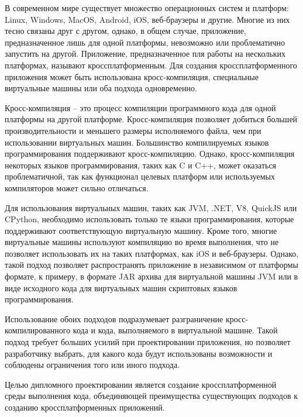 В современном мире существует множество операционных систем и платформ: Linux, Windows, MacOS, Android, iOS, веб-браузеры и другие.
Многие из них тесно связаны друг с другом, однако, в общем случае, приложение, предназначенное лишь для одной платформы, невозможно или проблематично запустить на другой.
Приложение, предназначенное пля работы на нескольких платформах, называют кроссплатформенным.
Для создания кроссплатформенного приложения может быть использована кросс-компиляция, специальные виртуальные машины или оба подхода одновременно. 

Кросс-компиляция -- это процесс компиляции программного кода для одной платформы на другой платформе.
Кросс-компиляция позволяет добиться большей производительности и меньшего размеры исполняемого файла, чем при использовании виртуальных машин.
Большинство компилируемых языков программирования поддерживают кросс-компиляцию.
Однако, кросс-компиляция некоторых языков программирования, таких как C и C++, может оказаться проблематичной, так как функционал целевых платформ или используемых компиляторов может сильно отличаться.

Для использования виртуальных машин, таких как JVM, .NET, V8, QuickJS или CPython, необходимо использовать только те языки программирования, которые поддерживают соответствующую виртуальную машину.
Кроме того, многие виртуальные машины используют компиляцию во время выполнения, что не позволяет использовать их на таких платформах, как iOS и веб-браузеры.
Однако, такой подход позволяет распространять приложение в независимом от платформы формате, к примеру, в формате JAR архива для виртуальной машины JVM или в виде исходного кода для виртуальных машин скриптовых языков программирования.

Использование обоих подходов подразумевает разграничение кросс-компилированного кода и кода, выполняемого в виртуальной машине. 
Такой подход требует больших усилий при проектировании приложения, но позволяет разработчику выбрать, для какого кода будут использованы возможности и соблюдены ограничения того или иного подхода.

Целью дипломного проектировании является создание кроссплатформенной среды выполнения кода, объединяющей преимущества существующих подходов к созданию кроссплатформенных приложений.
